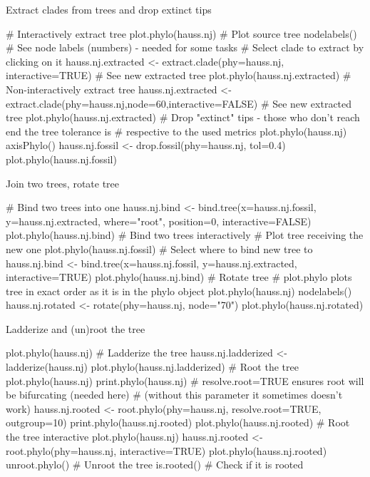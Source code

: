 \documentclass[compress, ucs, xelatex, 11pt, xcolor=svgnames, aspectratio=169,
	hyperref={
		bookmarks=true,
		unicode=true,
		colorlinks=true,
		pdftitle={Molecular data in R},
		plainpages=false,
		pdfauthor={Vojtech Zeisek},
		pdfsubject={Course about phylogeny and evolution in R},
		pdfcreator={XeLaTeX},
		pdfkeywords={R, evolution, phylogeny, molecular data},
		linkcolor=Crimson, %
		anchorcolor=Magenta, %
		citecolor=Magenta, %
		filecolor=Magenta, %
		menucolor=Magenta, %
		urlcolor=DodgerBlue, %
		pdftex},
	url={hyphens, lowtilde} %
	]{beamer}
\begin{document}
\begin{frame}[fragile]{Extract clades from trees and drop extinct tips}
	\begin{spluscode}
    # Interactively extract tree
    plot.phylo(hauss.nj) # Plot source tree
    nodelabels() # See node labels (numbers) - needed for some tasks
    # Select clade to extract by clicking on it
    hauss.nj.extracted <- extract.clade(phy=hauss.nj, interactive=TRUE)
    # See new extracted tree
    plot.phylo(hauss.nj.extracted)
    # Non-interactively extract tree
    hauss.nj.extracted <- extract.clade(phy=hauss.nj,node=60,interactive=FALSE)
    # See new extracted tree
    plot.phylo(hauss.nj.extracted)
    # Drop "extinct" tips - those who don't reach end the tree tolerance is
    # respective to the used metrics
    plot.phylo(hauss.nj)
    axisPhylo()
    hauss.nj.fossil <- drop.fossil(phy=hauss.nj, tol=0.4)
    plot.phylo(hauss.nj.fossil)
	\end{spluscode}
\end{frame}

\begin{frame}[fragile]{Join two trees, rotate tree}
	\begin{spluscode}
    # Bind two trees into one
    hauss.nj.bind <- bind.tree(x=hauss.nj.fossil, y=hauss.nj.extracted,
      where="root", position=0, interactive=FALSE)
    plot.phylo(hauss.nj.bind)
    # Bind two trees interactively
    # Plot tree receiving the new one
    plot.phylo(hauss.nj.fossil)
    # Select where to bind new tree to
    hauss.nj.bind <- bind.tree(x=hauss.nj.fossil, y=hauss.nj.extracted,
      interactive=TRUE)
    plot.phylo(hauss.nj.bind)
    # Rotate tree
    # plot.phylo plots tree in exact order as it is in the phylo object
    plot.phylo(hauss.nj)
    nodelabels()
    hauss.nj.rotated <- rotate(phy=hauss.nj, node="70")
    plot.phylo(hauss.nj.rotated)
	\end{spluscode}
\end{frame}

\begin{frame}[fragile]{Ladderize and (un)root the tree}
	\begin{spluscode}
    plot.phylo(hauss.nj) # Ladderize the tree
    hauss.nj.ladderized <- ladderize(hauss.nj)
    plot.phylo(hauss.nj.ladderized)
    # Root the tree
    plot.phylo(hauss.nj)
    print.phylo(hauss.nj)
    # resolve.root=TRUE ensures root will be bifurcating (needed here)
    # (without this parameter it sometimes doesn't work)
    hauss.nj.rooted <- root.phylo(phy=hauss.nj, resolve.root=TRUE, outgroup=10)
    print.phylo(hauss.nj.rooted)
    plot.phylo(hauss.nj.rooted)
    # Root the tree interactive
    plot.phylo(hauss.nj)
    hauss.nj.rooted <- root.phylo(phy=hauss.nj, interactive=TRUE)
    plot.phylo(hauss.nj.rooted)
    unroot.phylo() # Unroot the tree
    is.rooted() # Check if it is rooted
	\end{spluscode}
\end{frame}
\end{document}
